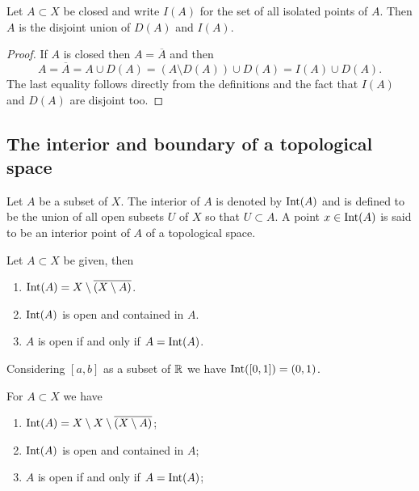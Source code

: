\documentclass[11pt,a4paper]{article}
\begin{document}
\begin{corollary}
  Let $A \subset X$ be closed and write $I(A)$ for the set of all isolated
  points of $A$. Then $A$ is the disjoint union of $D(A)$ and $I(A)$.
\end{corollary}
\begin{proof}
  If $A$ is closed then $A = \overline A$ and then
  \[
    A = \overline A = A \cup D(A) = \left(A \setminus D(A)\right) \cup D(A) =
    I(A) \cup D(A).
  \]
  The last equality follows directly from the definitions and the fact
  that $I(A)$ and $D(A)$ are disjoint too.
\end{proof}

\subsection{The interior and boundary of a topological space}

\begin{definition}[Interior]
  Let $A$ be a subset of $X$. The interior of $A$ is denoted by $\operatorname{Int}(A)$
  and is defined to be the union of all open subsets $U$ of $X$ so that 
  $U \subset A$. A point $x \in \operatorname{Int}(A)$ is said to be an interior point 
  of $A$ of a topological space.
\end{definition}

\begin{proposition}
  Let $A \subset X$ be given, then
  \begin{enumerate}
    \item $\operatorname{Int}(A) = X \setminus \overline{(X \setminus A)}$.
    \item $\operatorname{Int}(A)$ is open and contained in $A$.
    \item $A$ is open if and only if $A = \operatorname{Int}(A)$.
  \end{enumerate}
\end{proposition}

\begin{example}
  Considering $[a,b]$ as a subset of $\mathbb{R}$ we have $\operatorname{Int}([0,1]) = (0,1)$.
\end{example}

\begin{proposition}
  For $A \subset X$ we have
  \begin{enumerate}
    \item[(1)] $\operatorname{Int}(A) = X \setminus X \setminus \overline{(X \setminus A)}$;
    \item[(2)] $\operatorname{Int}(A)$ is open and contained in $A$;
    \item[(3)] $A$ is open if and only if $A = \operatorname{Int}(A)$;
  \end{enumerate}
\end{proposition}
\end{document}
